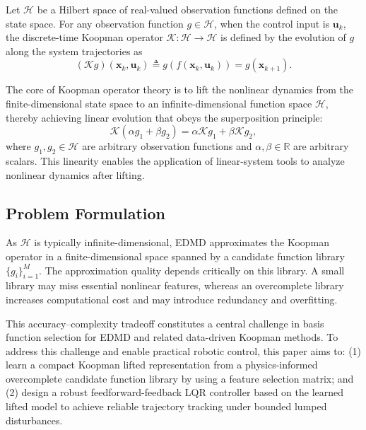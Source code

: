 \documentclass[final,3p,twocolumn,times]{elsarticle}
\newcommand{\x}{\mathbf{x}}
\newcommand{\uvec}{\mathbf{u}}
\begin{document}
Let \(\mathcal{H}\) be a Hilbert space of real-valued observation functions defined on the state space. For any observation function \(g \in \mathcal{H}\), when the control input is \(\uvec_k\), the discrete-time Koopman operator \(\mathcal{K}: \mathcal{H} \to \mathcal{H}\) is defined by the evolution of \(g\) along the system trajectories as
\begin{equation}
(\mathcal{K}g)(\x_k,\uvec_k) \triangleq g(f(\x_k,\uvec_k)) = g(\x_{k+1}).
\end{equation}

The core of Koopman operator theory is to lift the nonlinear dynamics
from the finite-dimensional state space to an infinite-dimensional
function space $\mathcal{H}$, thereby achieving linear evolution that
obeys the superposition principle:
\begin{equation}
\mathcal{K}(\alpha g_1 + \beta g_2) = \alpha \mathcal{K}g_1 + \beta \mathcal{K}g_2,
\end{equation}
where $g_1, g_2 \in \mathcal{H}$ are arbitrary observation functions and $\alpha, \beta \in \mathbb{R}$ are arbitrary
scalars. This linearity enables the application of linear-system tools to analyze
nonlinear dynamics after lifting.

\subsection{Problem Formulation}
\label{subsec:motivation}
As $\mathcal{H}$ is typically infinite-dimensional, EDMD approximates the Koopman operator in a finite-dimensional space spanned by a candidate function library $\{g_i\}_{i=1}^M$. The approximation quality depends critically on this library. A small library may miss essential nonlinear features, whereas an overcomplete library increases computational cost and may introduce redundancy and overfitting.

This accuracy--complexity tradeoff constitutes a central challenge in basis function selection for EDMD and related data-driven Koopman methods. To address this challenge and enable practical robotic control, this paper aims to: (1) learn a compact Koopman lifted representation from a physics-informed overcomplete candidate function library by using a feature selection matrix; and (2) design a robust feedforward-feedback LQR controller based on the learned lifted model to achieve reliable trajectory tracking under bounded lumped disturbances.


\end{document}
